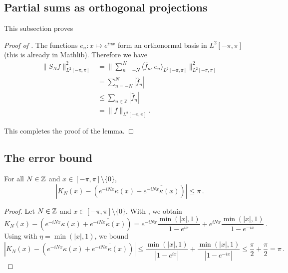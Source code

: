 \subsection{Partial sums as orthogonal projections}
\label{10projection}

This subsection proves 

\begin{proof}[Proof of ]
\leanok

The functions $e_n:x\mapsto e^{inx}$ form an orthonormal basis in $L^2[-\pi, \pi]$
(this is already in Mathlib).
Therefore we have
\begin{align*}
    \|S_Nf\|^2_{L^2[-\pi, \pi]}
    &= \|\sum_{n=-N}^N \langle\widehat{f}_n, e_n\rangle_{L^2[-\pi, \pi]}\|^2_{L^2[-\pi, \pi]} \\
    &= \sum_{n=-N}^N |\widehat{f}_n| \\
    &\le \sum_{n\in \mathbb{Z}} |\widehat{f}_n| \\
    &= \|f\|_{L^2[-\pi, \pi]}.
\end{align*}

This completes the proof of the lemma.
\end{proof}

\subsection{The error bound}
\label{10difference}

\begin{lemma}
    \label{Dirichlet-Hilbert}
    \leanok
    For all $N\in{\mathbb{Z}}$ and $x\in [-\pi,\pi] \setminus \{0\}$,
    \begin{equation*}
        \left|K_N(x) - (e^{-iNx}\kappa(x) + \overline{e^{-iNx}\kappa(x)})\right| \le \pi \,.
    \end{equation*}
\end{lemma}

\begin{proof}
    \leanok
    Let $N\in{\mathbb{Z}}$ and $x\in [-\pi,\pi] \setminus \{0\}$. With , we obtain
    \begin{equation*}
        K_N(x) - (e^{-iNx}\kappa(x) + \overline{e^{-iNx}\kappa(x)})
        = e^{-iNx} \frac{\min(|x|, 1) }{1 - e^{ix}} + e^{iNx} \frac{\min(|x|, 1) }{1 - e^{-ix}} \,.
    \end{equation*}
    Using  with $\eta = \min(|x|, 1)$, we bound
    \begin{equation*}
        \left|K_N(x) - (e^{-iNx}\kappa(x) + \overline{e^{-iNx}\kappa(x)})\right|
        \le \frac{\min(|x|, 1) }{|1 - e^{ix}|} + \frac{\min(|x|, 1)}{|1 - e^{-ix}|}
        \le \frac{\pi}{2} + \frac{\pi}{2} = \pi \,.
    \end{equation*}
\end{proof}

